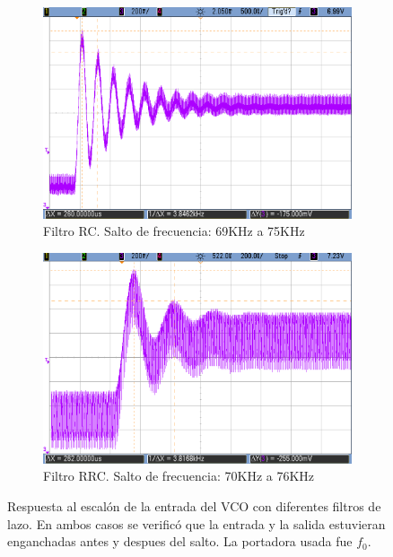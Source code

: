 \documentclass[../../tc_tp6_main.tex]{subfiles}
\begin{document}
\begin{figure}[H]	%
	\centering
	\begin{subfigure}[t]{0.45\textwidth}
		\centering
		\includegraphics[width=\textwidth]{figures/escalon_rc.png}
		\caption{Filtro RC. Salto de frecuencia: 69KHz a 75KHz}
		\label{fig:escalon_RC}
	\end{subfigure}%
	\hfill%
	\begin{subfigure}[t]{0.45\textwidth}
		\centering
		\includegraphics[width=\textwidth]{figures/escalon_rrc.png}
		\caption{Filtro RRC. Salto de frecuencia: 70KHz a 76KHz}
		\label{fig:escalon_RRC}
	\end{subfigure}
	\caption{Respuesta al escal\'on de la entrada del VCO con diferentes filtros de lazo. En ambos casos se verific\'o que la entrada y la salida estuvieran enganchadas antes y despues del salto. La portadora usada fue $f_0$.}
	\label{fig:escalon}
\end{figure}
\end{document}
